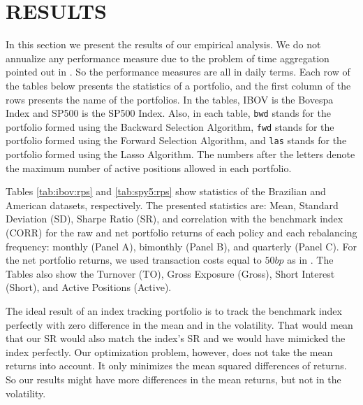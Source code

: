 \documentclass[12pt,oneside,a4paper]{memoir}
\begin{document}
\section{RESULTS} \label{sec:results:it}

In this section we present the results of our empirical analysis.
We do not annualize any performance measure due to the problem of time aggregation pointed out in .
So the performance measures are all in daily terms.
Each row of the tables below presents the statistics of a portfolio, and the first column of the rows presents the name of the portfolios.
In the tables, IBOV is the Bovespa Index and SP500 is the SP500 Index. 
Also, in each table,
\texttt{bwd} stands for the portfolio formed using the Backward Selection Algorithm, 
\texttt{fwd} stands for the portfolio formed using the Forward Selection Algorithm, and
\texttt{las} stands for the portfolio formed using the Lasso Algorithm.
The numbers after the letters denote the maximum number of active positions allowed in each portfolio.


Tables \ref{tab:ibov:rps} and \ref{tab:spy5:rps} show statistics of the Brazilian and American datasets, respectively.
The presented statistics are: Mean, Standard Deviation (SD), Sharpe Ratio (SR), and correlation with the benchmark index (CORR) for the raw and net portfolio returns of each policy and each rebalancing frequency: monthly (Panel A), bimonthly (Panel B), and quarterly (Panel C). 
For the net portfolio returns, we used transaction costs equal to $50bp$ as in .
The Tables also show the Turnover (TO), Gross Exposure (Gross), Short Interest (Short), and Active Positions (Active).

The ideal result of an index tracking portfolio is to track the benchmark index perfectly with zero difference in the mean and in the volatility.
That would mean that our SR would also match the index's SR and we would have mimicked the index perfectly.
Our optimization problem, however, does not take the mean returns into account. 
It only minimizes the mean squared differences of returns.
So our results might have more differences in the mean returns, but not in the volatility.
\end{document}
